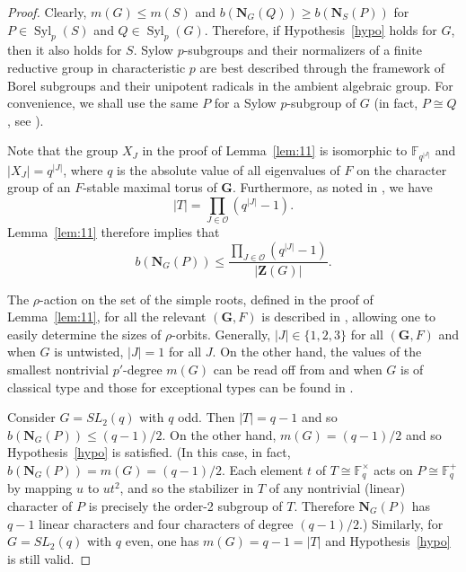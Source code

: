 \documentclass[12pt]{amsart}
\theoremstyle{plain}
\theoremstyle{definition}
\numberwithin{equation}{section}
\newcommand{\Syl}{\operatorname{Syl}}
\newcommand{\FF}{\mathbb{F}}
\newcommand{\bG}{\mathbf{G}}
\newcommand{\bN}{\mathbf{N}}
\newcommand{\bZ}{{\mathbf{Z}}}
\begin{document}
\begin{proof}
Clearly, $m(G)\leq m(S)$ and
$b(\bN_G(Q))\geq b(\bN_S(P))$ for $P\in\Syl_p(S)$ and $Q\in
\Syl_p(G)$. Therefore, if Hypothesis~\ref{hypo} holds for $G$, then
it also holds for $S$. Sylow $p$-subgroups and their normalizers of
a finite reductive group in characteristic $p$ are best described
through the framework of Borel subgroups and their unipotent
radicals in the ambient algebraic group. For convenience, we shall
use the same $P$ for a Sylow $p$-subgroup of $G$ (in fact, $P\cong
Q$, see \cite[p.~214]{MT11} ).

Note that the group $X_J$ in the proof of Lemma~\ref{lem:11} is
isomorphic to $\FF_{q^{|J|}}$ and $|X_J|=q^{|J|}$, where $q$ is the
absolute value of all eigenvalues of $F$ on the character group of
an $F$-stable maximal torus of $\bG$. Furthermore, as noted in
\cite[p.~74]{Carter85}, we have
\[
|T|=\prod_{J\in \mathcal{O}} (q^{|J|}-1).
\]
Lemma~\ref{lem:11} therefore implies that
\[
b(\bN_G(P))\leq \frac{\prod_{J\in \mathcal{O}}
(q^{|J|}-1)}{|\bZ(G)|}.
\]



The $\rho$-action on the set of the simple roots, defined in the
proof of Lemma~\ref{lem:11}, for all the relevant $(\bG,F)$ is
described in \cite[p.~37]{Carter85}, allowing one to easily
determine the sizes of $\rho$-orbits. Generally, $|J|\in\{1,2,3\}$
for all $(\bG,F)$ and when $G$ is untwisted, $|J|=1$ for all $J$. On
the other hand, the values of the smallest nontrivial $p'$-degree
$m(G)$ can be read off from \cite{TZ96} and \cite{Nguyen10} when $G$
is of classical type and those for exceptional types can be found in
\cite{Lubeck01}.



Consider $G=SL_2(q)$ with $q$ odd. Then $|T|=q-1$ and so
$b(\bN_G(P))\leq (q-1)/2$. On the other hand, $m(G)=(q-1)/2$ and so
Hypothesis~\ref{hypo} is satisfied. (In this case, in fact,
$b(\bN_G(P))=m(G)=(q-1)/2$. Each element $t$ of $T\cong
\FF_q^\times$ acts on $P\cong \FF_q^+$ by mapping $u$ to $ut^2$, and
so the stabilizer in $T$ of any nontrivial (linear) character of $P$
is precisely the order-2 subgroup of $T$. Therefore $\bN_G(P)$ has
$q-1$ linear characters and four characters of degree $(q-1)/2$.)
Similarly, for $G=SL_2(q)$ with $q$ even, one has $m(G)=q-1=|T|$ and
Hypothesis~\ref{hypo} is still valid.


\end{proof}
\end{document}
